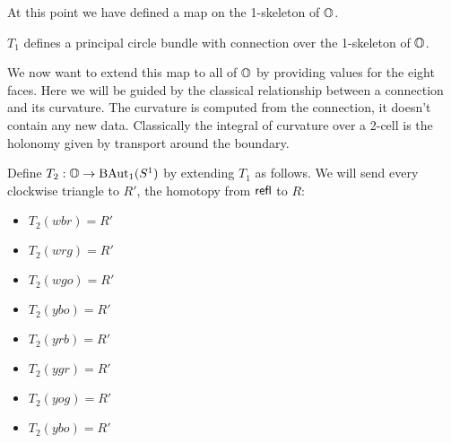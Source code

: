 \documentclass[12pt]{article}
\begin{document}
At this point we have defined a map on the 1-skeleton of \( \mathbb{O} \).

\begin{myclaim}
\( T_1 \) defines a principal circle bundle with connection over the 1-skeleton of \( \mathbb{O} \).
\end{myclaim}

We now want to extend this map to all of \( \mathbb{O} \) by providing values for the eight faces. Here we will be guided by the classical relationship between a connection and its curvature. The curvature is computed from the connection, it doesn't contain any new data. Classically the integral of curvature over a 2-cell is the holonomy given by transport around the boundary. 

\begin{mydef}
Define \( T_2:\mathbb{O}\to\mathrm{BAut}_1(S^1) \) by extending \( T_1 \) as follows. We will send every clockwise triangle to \( R' \), the homotopy from \( \mathsf{refl} \) to \( R \):
\begin{itemize}
\item \( T_2(wbr)=R' \) 
\item \( T_2(wrg)=R' \)
\item \( T_2(wgo)=R' \)
\item \( T_2(ybo)=R' \)
\item \( T_2(yrb)=R' \) 
\item \( T_2(ygr)=R' \)
\item \( T_2(yog)=R' \)
\item \( T_2(ybo)=R' \)
\end{itemize}
\end{mydef}



\end{document}
